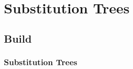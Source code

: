 

\section{Substitution Trees}
\subsection{Build}

\begin{frame}
	\frametitle{Substitution Trees}

\end{frame}

%
